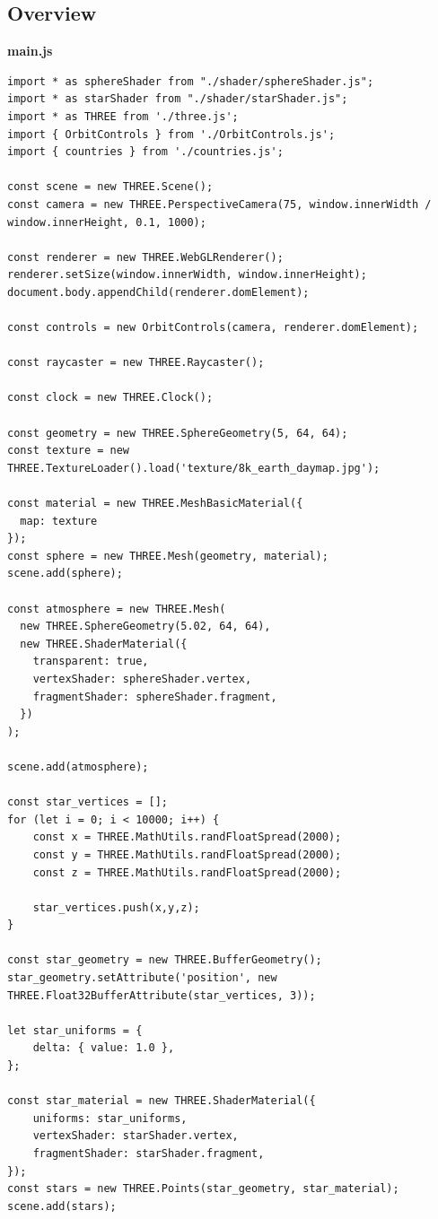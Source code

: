 \newpage
\subsection{Overview}
\textbf{main.js}
\begin{lstlisting}
import * as sphereShader from "./shader/sphereShader.js";
import * as starShader from "./shader/starShader.js";
import * as THREE from './three.js';
import { OrbitControls } from './OrbitControls.js';
import { countries } from './countries.js';

const scene = new THREE.Scene();
const camera = new THREE.PerspectiveCamera(75, window.innerWidth / window.innerHeight, 0.1, 1000);

const renderer = new THREE.WebGLRenderer();
renderer.setSize(window.innerWidth, window.innerHeight);
document.body.appendChild(renderer.domElement);

const controls = new OrbitControls(camera, renderer.domElement);

const raycaster = new THREE.Raycaster();

const clock = new THREE.Clock();

const geometry = new THREE.SphereGeometry(5, 64, 64);
const texture = new THREE.TextureLoader().load('texture/8k_earth_daymap.jpg');

const material = new THREE.MeshBasicMaterial({
  map: texture
});
const sphere = new THREE.Mesh(geometry, material);
scene.add(sphere);

const atmosphere = new THREE.Mesh(
  new THREE.SphereGeometry(5.02, 64, 64),
  new THREE.ShaderMaterial({
    transparent: true,
    vertexShader: sphereShader.vertex,
    fragmentShader: sphereShader.fragment,
  })
);

scene.add(atmosphere);

const star_vertices = [];
for (let i = 0; i < 10000; i++) {
    const x = THREE.MathUtils.randFloatSpread(2000);
    const y = THREE.MathUtils.randFloatSpread(2000);
    const z = THREE.MathUtils.randFloatSpread(2000);

    star_vertices.push(x,y,z);
}

const star_geometry = new THREE.BufferGeometry();
star_geometry.setAttribute('position', new THREE.Float32BufferAttribute(star_vertices, 3));

let star_uniforms = {
    delta: { value: 1.0 },
};

const star_material = new THREE.ShaderMaterial({ 
    uniforms: star_uniforms,
    vertexShader: starShader.vertex,
    fragmentShader: starShader.fragment,
});
const stars = new THREE.Points(star_geometry, star_material);
scene.add(stars);


\end{lstlisting}
